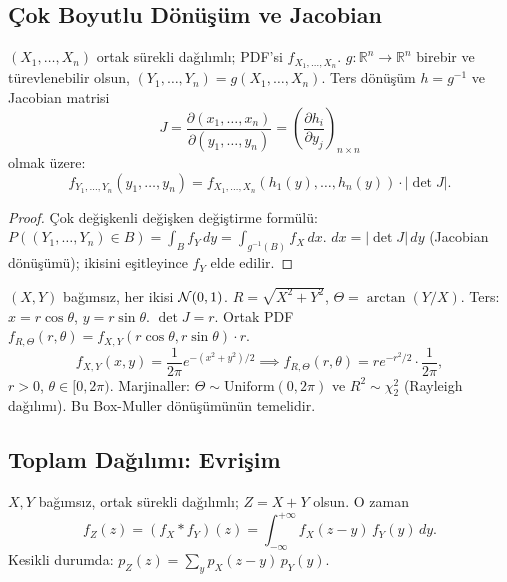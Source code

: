 \subsection{Çok Boyutlu Dönüşüm ve Jacobian}
\label{subsec:donusum_jacobian}

\begin{teorem}
\label{thm:jacobian}
$(X_1, \ldots, X_n)$ ortak sürekli dağılımlı; PDF'si $f_{X_1,\ldots,X_n}$.
$g : \mathbb{R}^n \to \mathbb{R}^n$ birebir ve türevlenebilir olsun,
$(Y_1, \ldots, Y_n) = g(X_1, \ldots, X_n)$.
Ters dönüşüm $h = g^{-1}$ ve Jacobian matrisi
\[
  J = \frac{\partial(x_1,\ldots,x_n)}{\partial(y_1,\ldots,y_n)}
    = \left(\frac{\partial h_i}{\partial y_j}\right)_{n \times n}
\]
olmak üzere:
\[
  f_{Y_1,\ldots,Y_n}(y_1,\ldots,y_n) = f_{X_1,\ldots,X_n}(h_1(y),\ldots,h_n(y)) \cdot |\det J|.
\]
\end{teorem}

\begin{proof}
Çok değişkenli değişken değiştirme formülü:
$P((Y_1,\ldots,Y_n) \in B) = \int_B f_Y \, dy = \int_{g^{-1}(B)} f_X \, dx$.
$dx = |\det J| \, dy$ (Jacobian dönüşümü); ikisini eşitleyince $f_Y$ elde edilir.
\end{proof}

\begin{ornek}
$(X, Y)$ bağımsız, her ikisi $\mathcal{N}(0,1)$.
$R = \sqrt{X^2+Y^2}$, $\Theta = \arctan(Y/X)$.
Ters: $x = r\cos\theta$, $y = r\sin\theta$.
$\det J = r$. Ortak PDF $f_{R,\Theta}(r, \theta) = f_{X,Y}(r\cos\theta, r\sin\theta) \cdot r$.
\[
  f_{X,Y}(x,y) = \frac{1}{2\pi} e^{-(x^2+y^2)/2}
  \implies f_{R,\Theta}(r,\theta) = r e^{-r^2/2} \cdot \frac{1}{2\pi},
\]
$r > 0$, $\theta \in [0, 2\pi)$.
Marjinaller: $\Theta \sim \mathrm{Uniform}(0, 2\pi)$ ve $R^2 \sim \chi^2_2$ (Rayleigh dağılımı).
Bu Box-Muller dönüşümünün temelidir.
\end{ornek}

\subsection{Toplam Dağılımı: Evrişim}
\label{subsec:evrisim}

\begin{tanim}
\label{def:evrisim}
$X, Y$ bağımsız, ortak sürekli dağılımlı; $Z = X + Y$ olsun. O zaman
\[
  f_Z(z) = (f_X * f_Y)(z) = \int_{-\infty}^{+\infty} f_X(z - y) \, f_Y(y) \, dy.
\]
Kesikli durumda: $p_Z(z) = \sum_y p_X(z-y) \, p_Y(y)$.
\end{tanim}

